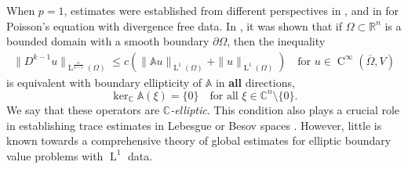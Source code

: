 \documentclass[a4paper,10pt]{amsart}
\newcommand{\R}{\mathbb R}
\renewcommand{\leq}{\leqslant}
\newcommand{\lebe}{\operatorname{L}}
\newcommand{\hold}{\operatorname{C}}
\newcommand{\A}{\mathbb{A}}
\numberwithin{equation}{section}
\theoremstyle{remark}
\numberwithin{equation}{section}
\begin{document}
	When \(p = 1\), estimates were established from different perspectives in \cite{Denk}, and in \cite{BrVS} for Poisson's equation with divergence free data. In \cite{GR}, it was shown that if \(\Omega \subset \R^n\) is a bounded domain with a smooth boundary \(\partial \Omega\), then the inequality
	\begin{align*}
		\|D^{k-1}u\|_{\lebe^{\frac{n}{n-1}}(\Omega)}\leq c\left(\|\A u\|_{\lebe^1(\Omega)}+\|u\|_{\lebe^1(\Omega)}\right)\quad \text{for }u\in\hold^\infty(\overline\Omega,V)
	\end{align*}
	is equivalent with boundary ellipticity of $\A$ in \textbf{all} directions, $$
	\ker_{\mathbb{C}}\A(\xi)=\{0\}\quad\text{for all }\xi\in\mathbb{C}^n\setminus\{0\}.$$
	We say that these operators are \emph{$\mathbb{C}$-elliptic}. This condition also plays a crucial role in establishing trace estimates in Lebesgue or Besov spaces \cite{BDG,DieGme21,GRVS}. However, little is
	known towards a comprehensive theory of global estimates for elliptic boundary value
	problems with $\lebe^1$ data.%
	
\end{document}
